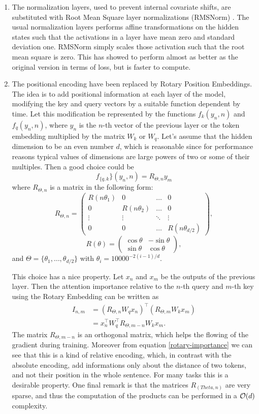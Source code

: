 \documentclass[]{marticle}
\begin{document}
\begin{enumerate}
\item The normalization layers, used to prevent internal covariate shifts, are substituted with Root
Mean Square layer normalizations (RMSNorm) \cite{paper-rmsnorm}. The usual normalization layers
performs affine transformations on the hidden states such that the activations in a layer have mean
zero and standard deviation one. RMSNorm simply scales those activation such that the root mean
square is zero. This has showed to perform almost as better as the original version in terms of
loss, but is faster to compute.

\item The positional encoding have been replaced by Rotary Position Embeddings. The idea is to add
positional information at each layer of the model, modifying the key and query vectors by a
suitable function dependent by time. Let this modification be represented by the functions 
$f_k(y_n, n)$ and $f_q(y_n, n)$, where $y_n$ is the $n$-th vector of the previous layer or the
token embedding  multiplied by the matrix $W_k$ or $W_q$. Let's assume that the hidden dimension
to be an even number $d$, which is reasonable since for performance reasons typical values of
dimensions are large powers of two or some of their multiples. Then a good choice could be
$$ f_{\{q, k}\}(y_n, n) = R_{\Theta, n} y_m $$
where $R_{\Theta, n}$ is a matrix in the following form:
$$
    R_{\Theta, n} = \begin{pmatrix} 
      R(n \theta_1)& 0& \dots& 0 \\
      0& R(n \theta_2)& \dots& 0 \\
      \vdots& \vdots& \ddots& \vdots \\
      0&0& \dots& R(n \theta_{d / 2})
    \end{pmatrix},
$$
$$
    R(\theta) = \begin{pmatrix} 
        \cos\theta & -\sin\theta \\ \sin\theta & \cos\theta
    \end{pmatrix},
$$
and $\Theta = \{ \theta_1, \dots, \theta_{d / 2} \}$ with $\theta_i = 10000^{-2(i-1) / d}$.

This choice has a nice property. Let $x_n$ and $x_m$ be the outputs of the previous layer. Then
the attention importance relative to the $n$-th query and $m$-th key using the Rotary Embedding
can be written as
\begin{align}\label{rotary-importance}
I_{n,m} &= (R_{\Theta, n}W_q x_n)^\top (R_{\Theta, m}W_k x_m) \\ 
        &=  x_n^\top W_q^\top R_{\Theta, m-n} W_k x_m. \nonumber
\end{align}
The matrix $R_{\Theta, m-n}$ is an orthogonal matrix, which helps the flowing of the gradient
during training. Moreover from equation \ref{rotary-importance} we can see that this is a kind of
relative encoding, which, in contrast with the absolute encoding, add informations only about the
distance of two tokens, and not their position in the whole sentence. For many tasks this is a
desirable property. One final remark is that the matrices $R_(Theta, n)$ are very sparse, and thus
the computation of the products can be performed in a $\mathcal{O}(d)$ complexity.


\end{enumerate}
\end{document}
